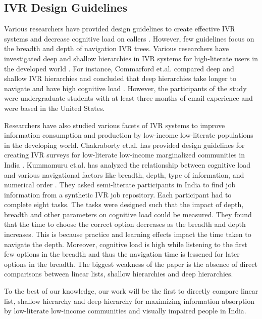 \documentclass{sigchi}
\begin{document}
\subsection{IVR Design Guidelines}
Various researchers have provided design guidelines to create effective IVR systems and decrease cognitive load on callers	 \cite{Ndwe2008,Suhm2008,MSDNSpeech,Halstead-Nussloch1989}. However, few guidelines focus on the breadth and depth of navigation IVR trees. Various researchers have investigated deep and shallow hierarchies in IVR systems for high-literate users in the developed world \cite{Huguenard1997,Virzi1997,Commarford2008}. For instance, Commarford et.al. compared deep and shallow IVR hierarchies and concluded that deep hierarchies take longer to navigate and have high cognitive load \cite{Commarford2008}. However, the participants of the study were undergraduate students with at least three months of email experience and were based in the United States. 

Researchers have also studied various facets of IVR systems to improve information consumption and production by low-income low-literate populations in the developing world. Chakraborty et.al. has provided design guidelines for creating IVR surveys for low-literate low-income marginalized communities in India \cite{Chakraborty2013}. Kummamuru et.al. has analyzed the relationship between cognitive load and various navigational factors like breadth, depth, type of information, and numerical order \cite{Kummamuru2012}. They asked semi-literate participants in India to find job information from a synthetic IVR job repository. Each participant had to complete eight tasks. The tasks were designed such that the impact of depth, breadth and other parameters on cognitive load could be measured. They found that the time to choose the correct option decreases as the breadth and depth increases. This is because practice and learning effects impact the time taken to navigate the depth. Moreover, cognitive load is high while listening to the first few options in the breadth and thus the navigation time is lessened for later options in the breadth. The biggest weakness of the paper is the absence of direct comparisons between linear lists, shallow hierarchies and deep hierarchies.

To the best of our knowledge, our work will be the first to directly compare linear list, shallow hierarchy and deep hierarchy for maximizing information absorption by low-literate low-income communities and visually impaired people in India. 
\end{document}
